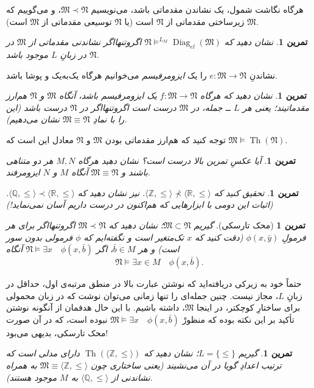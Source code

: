 \documentclass[12pt,a4paper]{report}
\theoremstyle{colorhead}
\newtheorem{tam}[thm]{تمرین}
\DeclareMathOperator{\Th}{Th}
\DeclareMathOperator{\diag}{Diag}
\begin{document}
هرگاه نگاشت شمول، یک نشاندن مقدماتی باشد، می‌نویسیم
$\mathfrak{M}\prec \mathfrak{N}$، 
و می‌گوییم که
$\mathfrak{M}$
زیرساختی مقدماتی از
$\mathfrak{N}$
است (یا 
$\mathfrak{N}$
توسیعی مقدماتی از
$\mathfrak{M}$
است).
\begin{tam}
نشان دهید که 
$\mathfrak{N}\models^{L_M} \diag_{el}(\mathfrak{M})$
اگروتنهااگر نشاندنی مقدماتی از
$\mathfrak{M}$
در 
$\mathfrak{N}$
در زبانِ
$L$
موجود باشد. 
\end{tam}
نشاندنِ
$e:\mathfrak{M}\to\mathfrak{N}$
را یک 
\textit{ایزومرفیسم }
می‌خوانیم هرگاه یک‌به‌یک و پوشا باشد.
\begin{tam}
نشان دهید که هرگاه
$f:\mathfrak{M}\to \mathfrak{N}$
یک ایزومرفیسم باشد، آنگاه 
$\mathfrak{M}$
و
$\mathfrak{N}$
هم‌ارز مقدماتیند؛ یعنی هر 
$L$ ــ
جمله، در
$\mathfrak{M}$
درست است اگروتنهااگر در
$\mathfrak{N}$
درست باشد (این را با نمادِ
$\mathfrak{M}\equiv \mathfrak{N}$
نشان می‌دهیم).
\end{tam}
توجه کنید که هم‌ارز مقدماتی بودن
$\mathfrak{M}$
و
$\mathfrak{N}$
معادل این است که
$\mathfrak{M}\models \Th(\mathfrak{N})$.
\begin{tam}
آيا عکسِ تمرین بالا درست است؟ نشان دهید هرگاه
$M,N$
هر دو متناهی باشند و
$\mathfrak{M}\equiv \mathfrak{N}$
آنگاه
$M$
و
$N$
ایزومرفند.
\end{tam}
\begin{tam}
تحقیق کنید که
$\langle \mathbb{Z},\leq\rangle \not\prec \langle \mathbb{R},\leq\rangle$.
نیز نشان دهید که
$\langle \mathbb{Q},\leq \rangle\prec \langle \mathbb{R},\leq\rangle$.
(اثبات این دومی با ابزارهایی که هم‌اکنون در درست داریم آسان نمی‌نماید!)
\end{tam}
\begin{tam}[محک تارسکی]
گیریم
$\mathfrak{M}\subset \mathfrak{N}$؛
نشان دهید که
$\mathfrak{M}\prec \mathfrak{N}$
اگروتنهااگر 
برای هر فرمولِ
$\phi(x,\bar{y})$
(دقت کنید که
$x$
تک‌متغیر است و نگفته‌ایم که 
$\phi$
فرمولی بدون سور است)
و هر
$\bar{b}\in M$،
اگر
$\mathfrak{N}\models \exists x \quad \phi(x,\bar{b})$
آنگاه
\[
\mathfrak{N}\models \exists x\in M \quad \phi(x,\bar{b}).
\]
\end{tam}
حتماً خود به زیرکی دریافته‌اید که نوشتن عبارت بالا در منطق مرتبه‌ی اول، حداقل در زبانِ
$L$،
مجاز نیست. چنین جمله‌ای را تنها زمانی می‌توان نوشت که 
در زبان محمولی برای ساختارِ کوچکتر، در اینجا
$\mathfrak{M}$،
داشته باشیم. با این حال هدفمان از آنگونه نوشتن تأکید بر این نکته بوده  که منظورْ 
$\mathfrak{M}\models \exists x \quad \phi(x,\bar{b})$
نبوده است، که در آن صورت محک تارسکی،‌ بدیهی می‌بود!
\begin{tam}
گیریم
$L=\{\leq\}$؛
نشان‌ دهید که
$\Th(\langle \mathbb{Z},\leq\rangle)$
دارای مدلی است که ترتیب اعدادِ گویا در آن می‌نشیند (یعنی 
ساختاری چون
$\mathfrak{M}\equiv \langle \mathbb{Z},\leq\rangle$
به همراه نشاندنی از 
$\langle \mathbb{Q},\leq\rangle$
به
$M$
موجود هستند).
\end{tam}
\end{document}
